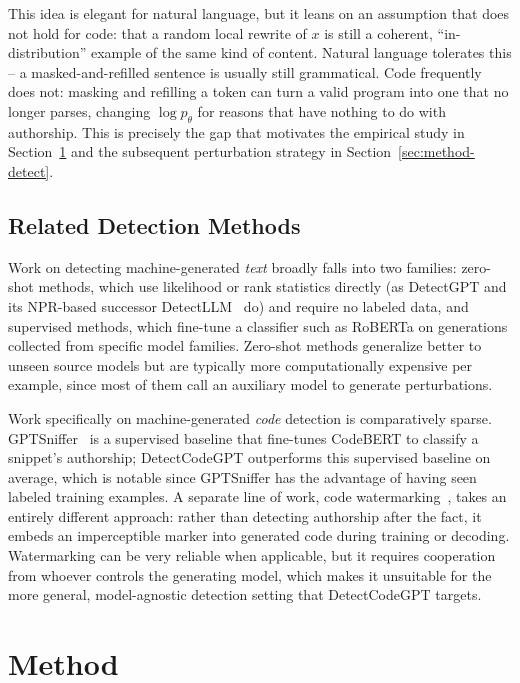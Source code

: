 \documentclass[manuscript,review]{acmart}
\begin{document}
This idea is elegant for natural language, but it leans on an assumption that does not hold for code: that a random local rewrite of $x$ is still a coherent, ``in-distribution'' example of the same kind of content. Natural language tolerates this -- a masked-and-refilled sentence is usually still grammatical. Code frequently does not: masking and refilling a token can turn a valid program into one that no longer parses, changing $\log p_\theta$ for reasons that have nothing to do with authorship. This is precisely the gap that motivates the empirical study in Section~\ref{sec:method} and the subsequent perturbation strategy in Section~\ref{sec:method-detect}.

\subsection{Related Detection Methods}
Work on detecting machine-generated \emph{text} broadly falls into two families: zero-shot methods, which use likelihood or rank statistics directly (as DetectGPT and its NPR-based successor DetectLLM~\cite{su2023detectllm} do) and require no labeled data, and supervised methods, which fine-tune a classifier such as RoBERTa on generations collected from specific model families. Zero-shot methods generalize better to unseen source models but are typically more computationally expensive per example, since most of them call an auxiliary model to generate perturbations.

Work specifically on machine-generated \emph{code} detection is comparatively sparse. GPTSniffer~\cite{nguyen2023snippet} is a supervised baseline that fine-tunes CodeBERT to classify a snippet's authorship; DetectCodeGPT outperforms this supervised baseline on average, which is notable since GPTSniffer has the advantage of having seen labeled training examples. A separate line of work, code watermarking~\cite{lee2023watermarking}, takes an entirely different approach: rather than detecting authorship after the fact, it embeds an imperceptible marker into generated code during training or decoding. Watermarking can be very reliable when applicable, but it requires cooperation from whoever controls the generating model, which makes it unsuitable for the more general, model-agnostic detection setting that DetectCodeGPT targets.

\section{Method}
\label{sec:method}
\end{document}
